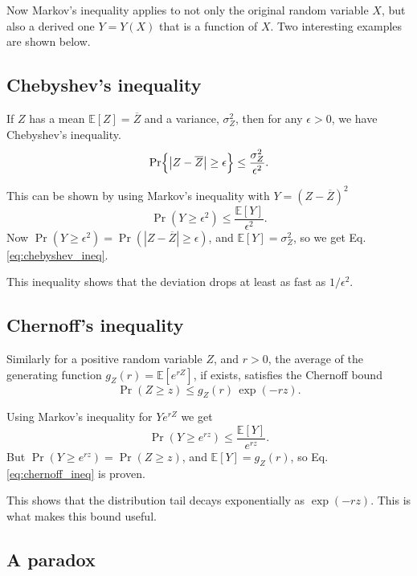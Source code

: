 \documentclass{article}
\begin{document}
Now Markov's inequality applies to not only
the original random variable $X$, but also a derived one $Y = Y(X)$
that is a function of $X$.
Two interesting examples are shown below.

\subsection{Chebyshev's inequality}

If $Z$ has a mean $\mathbb{E}[Z] = \overline Z$
and a variance, $\sigma_Z^2$, then for any $\epsilon > 0$,
we have Chebyshev's inequality.
\begin{equation}
\operatorname{Pr}\Bigl\{\bigl|Z - \overline Z \bigr|\ge \epsilon\Bigr\} \le \frac{\sigma_Z^2}{\epsilon^2}.
\label{eq:chebyshev_ineq}
\end{equation}

This can be shown by using Markov's inequality with $Y = (Z - \overline Z)^2$
$$
\operatorname{Pr}(Y \ge \epsilon^2)
\le
\frac{ \mathbb{E}[Y] } { \epsilon^2 }.
$$
Now
$\operatorname{Pr}(Y \ge \epsilon^2) = \operatorname{Pr}(|Z - \overline Z| \ge \epsilon)$,
and
$\mathbb{E}[Y] = \sigma_Z^2$,
so we get Eq. \eqref{eq:chebyshev_ineq}.

This inequality shows that the deviation drops at least as fast as $1/\epsilon^2$.


\subsection{Chernoff's inequality}

Similarly for a positive random variable $Z$, and $r > 0$, the average of
the generating function $g_Z(r) = \mathbb{E}[e^{rZ}]$, if exists, satisfies
the Chernoff bound
\begin{equation}
\operatorname{Pr}(Z \ge z)
\le g_Z(r) \, \exp(-rz).
\label{eq:chernoff_ineq}
\end{equation}

Using Markov's inequality for $Y e^{rZ}$ we get
$$
\operatorname{Pr}(Y \ge e^{rz})
\le
\frac{ \mathbb{E}[Y] } { e^{rz} }.
$$
But $\operatorname{Pr}(Y \ge e^{rz}) = \operatorname{Pr}(Z \ge z)$,
and $\mathbb{E}[Y] = g_Z(r)$, so Eq. \eqref{eq:chernoff_ineq} is proven.

This shows that the distribution tail decays exponentially as $\exp(-rz)$.
This is what makes this bound useful.


\subsection{A paradox}
\end{document}
